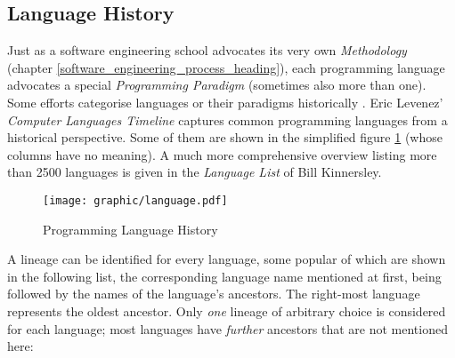 %
%
%
%
%
%
%

\subsection{Language History}
\label{language_history_heading}

Just as a software engineering school advocates its very own \emph{Methodology}
(chapter \ref{software_engineering_process_heading}), each programming language
advocates a special \emph{Programming Paradigm} \cite{wikipedia} (sometimes
also more than one). Some efforts categorise languages or their paradigms
historically \cite{steppan}. Eric Levenez' \emph{Computer Languages Timeline}
\cite{levenez} captures common programming languages from a historical
perspective. Some of them are shown in the simplified figure
\ref{language_figure} (whose columns have no meaning). A much more
comprehensive overview listing more than 2500 languages is given in the
\emph{Language List} \cite{kinnersley} of Bill Kinnersley.

\begin{figure}[ht]
    \begin{center}
        \texttt{[image: graphic/language.pdf]}
        \caption{Programming Language History}
        \label{language_figure}
    \end{center}
\end{figure}

A lineage can be identified for every language, some popular of which are shown
in the following list, the corresponding language name mentioned at first,
being followed by the names of the language's ancestors. The right-most
language represents the oldest ancestor. Only \emph{one} lineage of arbitrary
choice is considered for each language; most languages have \emph{further}
ancestors that are not mentioned here:

